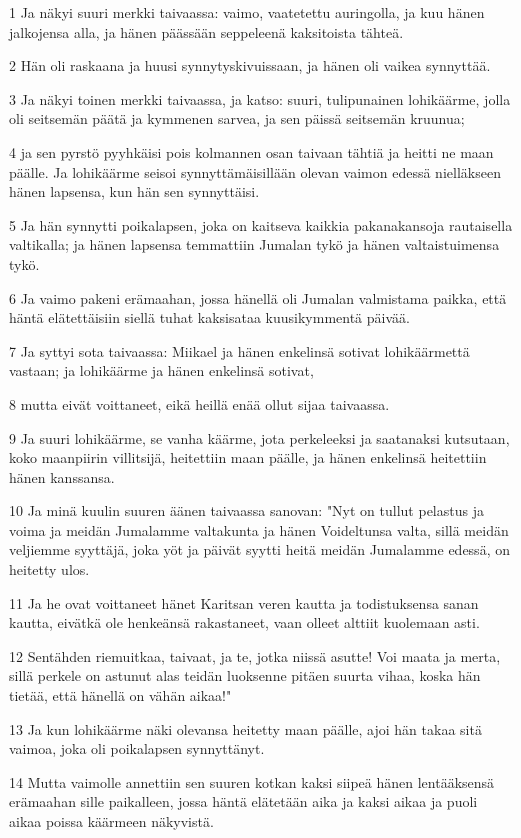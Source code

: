 \par 1 Ja näkyi suuri merkki taivaassa: vaimo, vaatetettu auringolla, ja kuu hänen jalkojensa alla, ja hänen päässään seppeleenä kaksitoista tähteä.
\par 2 Hän oli raskaana ja huusi synnytyskivuissaan, ja hänen oli vaikea synnyttää.
\par 3 Ja näkyi toinen merkki taivaassa, ja katso: suuri, tulipunainen lohikäärme, jolla oli seitsemän päätä ja kymmenen sarvea, ja sen päissä seitsemän kruunua;
\par 4 ja sen pyrstö pyyhkäisi pois kolmannen osan taivaan tähtiä ja heitti ne maan päälle. Ja lohikäärme seisoi synnyttämäisillään olevan vaimon edessä nielläkseen hänen lapsensa, kun hän sen synnyttäisi.
\par 5 Ja hän synnytti poikalapsen, joka on kaitseva kaikkia pakanakansoja rautaisella valtikalla; ja hänen lapsensa temmattiin Jumalan tykö ja hänen valtaistuimensa tykö.
\par 6 Ja vaimo pakeni erämaahan, jossa hänellä oli Jumalan valmistama paikka, että häntä elätettäisiin siellä tuhat kaksisataa kuusikymmentä päivää.
\par 7 Ja syttyi sota taivaassa: Miikael ja hänen enkelinsä sotivat lohikäärmettä vastaan; ja lohikäärme ja hänen enkelinsä sotivat,
\par 8 mutta eivät voittaneet, eikä heillä enää ollut sijaa taivaassa.
\par 9 Ja suuri lohikäärme, se vanha käärme, jota perkeleeksi ja saatanaksi kutsutaan, koko maanpiirin villitsijä, heitettiin maan päälle, ja hänen enkelinsä heitettiin hänen kanssansa.
\par 10 Ja minä kuulin suuren äänen taivaassa sanovan: "Nyt on tullut pelastus ja voima ja meidän Jumalamme valtakunta ja hänen Voideltunsa valta, sillä meidän veljiemme syyttäjä, joka yöt ja päivät syytti heitä meidän Jumalamme edessä, on heitetty ulos.
\par 11 Ja he ovat voittaneet hänet Karitsan veren kautta ja todistuksensa sanan kautta, eivätkä ole henkeänsä rakastaneet, vaan olleet alttiit kuolemaan asti.
\par 12 Sentähden riemuitkaa, taivaat, ja te, jotka niissä asutte! Voi maata ja merta, sillä perkele on astunut alas teidän luoksenne pitäen suurta vihaa, koska hän tietää, että hänellä on vähän aikaa!"
\par 13 Ja kun lohikäärme näki olevansa heitetty maan päälle, ajoi hän takaa sitä vaimoa, joka oli poikalapsen synnyttänyt.
\par 14 Mutta vaimolle annettiin sen suuren kotkan kaksi siipeä hänen lentääksensä erämaahan sille paikalleen, jossa häntä elätetään aika ja kaksi aikaa ja puoli aikaa poissa käärmeen näkyvistä.
